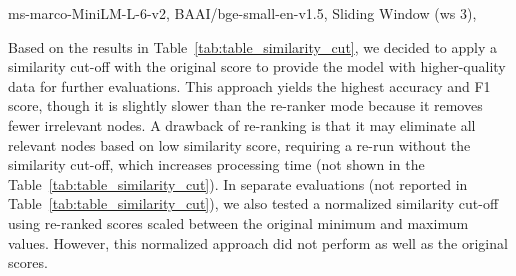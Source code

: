 \begin{table}[h!]
    \centering
    \noindent
    \caption{Performance evaluation of similarity cut-off method on the FactBench dataset, using the Gemma2 model.}
    {\scriptsize ms-marco-MiniLM-L-6-v2, BAAI/bge-small-en-v1.5, Sliding Window (ws 3), }\\
    \label{tab:table_similarity_cut}
\end{table}

Based on the results in Table~\ref{tab:table_similarity_cut}, we decided to apply a similarity cut-off with the original score to provide the model with higher-quality data for further evaluations.
This approach yields the highest accuracy and F1 score, though it is slightly slower than the re-ranker mode because it removes fewer irrelevant nodes.
A drawback of re-ranking is that it may eliminate all relevant nodes based on low similarity score, requiring a re-run without the similarity cut-off, which increases processing time (not shown in the Table~\ref{tab:table_similarity_cut}).
In separate evaluations (not reported in Table~\ref{tab:table_similarity_cut}), we also tested a normalized similarity cut-off using re-ranked scores scaled between the original minimum and maximum values.
However, this normalized approach did not perform as well as the original scores.

